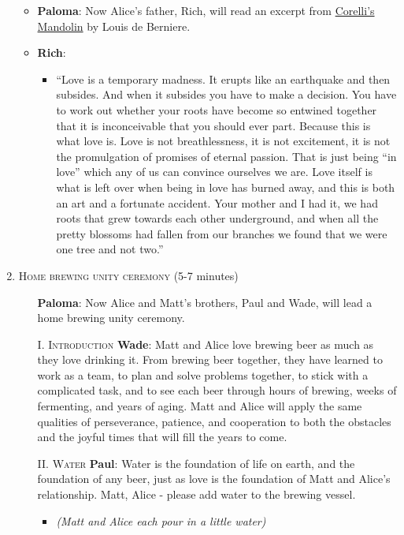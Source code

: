 \documentclass[12pt]{article}
\begin{document}
\begin{enumerate}
  \begin{itemize}
  \item {\bf Paloma}: Now Alice's father, Rich, will read an excerpt from \underline{Corelli's Mandolin} by Louis de Berniere.

    \newpage

  \item {\bf Rich}:
    \begin{itemize}
    \item ``Love is a temporary madness. It erupts like an earthquake and then subsides. And when it subsides you have to make a decision. You have to work out whether your roots have become so entwined together that it is inconceivable that you should ever part. Because this is what love is. Love is not breathlessness, it is not excitement, it is not the promulgation of promises of eternal passion. That is just being ``in love'' which any of us can convince ourselves we are. Love itself is what is left over when being in love has burned away, and this is both an art and a fortunate accident. Your mother and I had it, we had roots that grew towards each other underground, and when all the pretty blossoms had fallen from our branches we found that we were one tree and not two.''
    \end{itemize}
  \end{itemize}

\item \textsc{Home brewing unity ceremony} (5-7 minutes)
  \begin{itemize}
  \item [] {\bf Paloma}: Now Alice and Matt's brothers, Paul and Wade, will lead a home brewing unity ceremony.
  
  \item [I.] \textsc{Introduction}
    {\bf Wade}: Matt and Alice love brewing beer as much as they love drinking it. From brewing beer together, they have learned to work as a team, to plan and solve problems together, to stick with a complicated task, and to see each beer through hours of brewing, weeks of fermenting, and years of aging. Matt and Alice  will apply the same qualities of perseverance, patience, and cooperation to both the obstacles and the joyful times that will fill the years to come.
    
  \item [II.] \textsc{Water}
    {\bf Paul}: Water is the foundation of life on earth, and the foundation of any beer, just as love is the foundation of Matt and Alice's relationship. Matt, Alice - please add water to the brewing vessel.
    \begin{itemize}
    \item \textit{(Matt and Alice each pour in a little water)}
    \end{itemize}


\end{itemize}
\end{enumerate}
\end{document}
